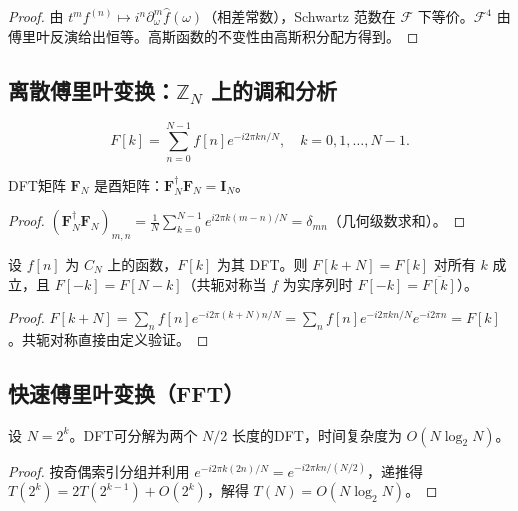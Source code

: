 \begin{proof}
由 $t^m f^{(n)}\mapsto i^n\partial_\omega^m\hat f(\omega)$（相差常数），Schwartz 范数在 $\mathcal{F}$ 下等价。$\mathcal{F}^4$ 由傅里叶反演给出恒等。高斯函数的不变性由高斯积分配方得到。
\end{proof}

\subsection{\texorpdfstring{离散傅里叶变换：$\mathbb{Z}_N$ 上的调和分析}{离散傅里叶变换}}

\begin{definition}[DFT]\label{def:dft}
\[F[k] = \sum_{n=0}^{N-1} f[n] e^{-i 2\pi kn / N}, \quad k = 0,1,\dots,N-1.\]
\end{definition}

\begin{proposition}[DFT矩阵的酉性]\label{prop:dft_unitary}
DFT矩阵 $\mathbf{F}_N$ 是酉矩阵：$\mathbf{F}_N^\dagger \mathbf{F}_N = \mathbf{I}_N$。
\end{proposition}

\begin{proof}
$(\mathbf{F}_N^\dagger \mathbf{F}_N)_{m,n} = \frac{1}{N}\sum_{k=0}^{N-1} e^{i2\pi k(m-n)/N} = \delta_{mn}$（几何级数求和）。
\end{proof}

\begin{lemma}[DFT的周期性引理]\label{lem:dft_periodicity}
设 $f[n]$ 为 $C_N$ 上的函数，$F[k]$ 为其 DFT。则 $F[k+N] = F[k]$ 对所有 $k$ 成立，且 $F[-k] = F[N-k]$（共轭对称当 $f$ 为实序列时 $F[-k] = \overline{F[k]}$）。
\end{lemma}

\begin{proof}
$F[k+N] = \sum_n f[n] e^{-i2\pi(k+N)n/N} = \sum_n f[n] e^{-i2\pi kn/N} e^{-i2\pi n} = F[k]$。共轭对称直接由定义验证。
\end{proof}

\subsection{\texorpdfstring{快速傅里叶变换（FFT）}{快速傅里叶变换}}

\begin{theorem}\label{thm:radix2_fft}
设 $N = 2^k$。DFT可分解为两个 $N/2$ 长度的DFT，时间复杂度为 $O(N\log_2 N)$。
\end{theorem}

\begin{proof}
按奇偶索引分组并利用 $e^{-i2\pi k(2n)/N} = e^{-i2\pi kn/(N/2)}$，递推得 $T(2^k) = 2T(2^{k-1}) + O(2^k)$，解得 $T(N) = O(N\log_2 N)$。
\end{proof}


